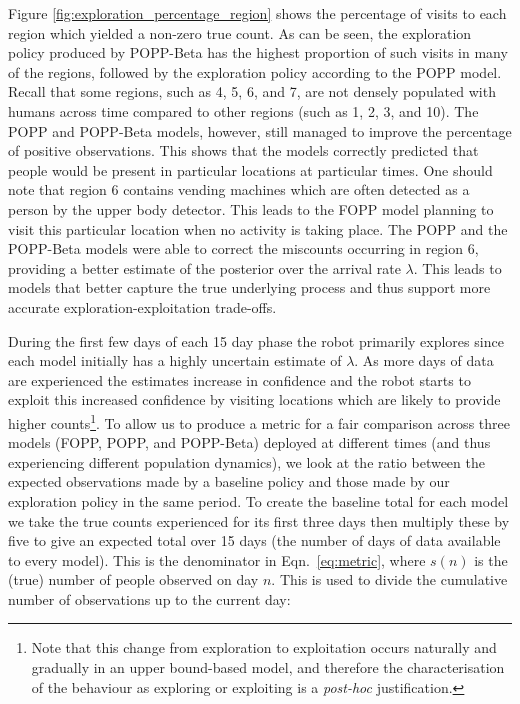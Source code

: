 Figure \ref{fig:exploration_percentage_region} shows the percentage of visits to each region which yielded a non-zero true count. As can be seen, the exploration policy produced by POPP-Beta has the highest proportion of such visits in many of the regions, followed by the exploration policy according to the POPP model. Recall that some regions, such as 4, 5, 6, and 7, are not densely populated with humans across time compared to other regions (such as 1, 2, 3, and 10). The POPP and POPP-Beta models, however, still managed to improve the percentage of positive observations. This shows that the models correctly predicted that people would be present in particular locations at particular times. One should note that region 6 contains vending machines which are often detected as a person by the upper body detector. This leads to the FOPP model planning to visit this particular location when no activity is taking place. The POPP and the POPP-Beta models were able to correct the miscounts occurring in region 6, providing a better estimate of the posterior over the arrival rate $\lambda$. This leads to models that better capture the true underlying process and thus support more accurate exploration-exploitation trade-offs.


During the first few days of each 15 day phase the robot primarily explores since each model initially has a highly uncertain estimate of $\lambda$. As more days of data are experienced the estimates increase in confidence and the robot starts to exploit this increased confidence by visiting locations which are likely to provide higher counts\footnote{Note that this change from exploration to exploitation occurs naturally and gradually in an upper bound-based model, and therefore the characterisation of the behaviour as exploring or exploiting is a \emph{post-hoc} justification.}.
% 
To allow us to produce a metric for a fair comparison across three models (FOPP, POPP, and POPP-Beta) deployed at different times (and thus experiencing different population dynamics), we look at the ratio between the expected observations made by a baseline policy and those made by our exploration policy in the same period. 
% 
To create the baseline total for each model we take the true counts experienced for its first three days then multiply these by five to give an expected total over 15 days (the number of days of data available to every model). This is the denominator in Eqn.~\ref{eq:metric}, where $s(n)$ is the (true) number of people observed on day $n$. This is used to divide the cumulative number of observations up to the current day:

